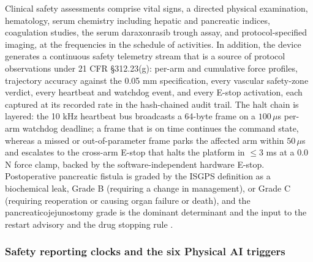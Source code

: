 Clinical safety assessments comprise vital signs, a directed physical examination,
hematology, serum chemistry including hepatic and pancreatic indices, coagulation
studies, the serum daraxonrasib trough assay, and protocol-specified imaging, at the
frequencies in the schedule of activities. In addition, the device generates a
continuous safety telemetry stream that is a source of protocol observations under
21 CFR \S 312.23(g): per-arm and cumulative force profiles, trajectory accuracy
against the 0.05 mm specification, every vascular safety-zone verdict, every
heartbeat and watchdog event, and every E-stop activation, each captured at its
recorded rate in the hash-chained audit trail. The halt chain is layered: the 10 kHz
heartbeat bus broadcasts a 64-byte frame on a $100\,\mu$s per-arm watchdog deadline;
a frame that is on time continues the command state, whereas a missed or
out-of-parameter frame parks the affected arm within $50\,\mu$s and escalates to the
cross-arm E-stop that halts the platform in $\leq 3$ ms at a 0.0 N force clamp,
backed by the software-independent hardware E-stop. Postoperative pancreatic fistula
is graded by the ISGPS definition as a biochemical leak, Grade B (requiring a change
in management), or Grade C (requiring reoperation or causing organ failure or death),
and the pancreaticojejunostomy grade is the dominant determinant and the input to the
restart advisory and the drug stopping rule \cite{daraxwhipple,oncotrialllm}.

\subsubsection*{Safety reporting clocks and the six Physical AI triggers}

